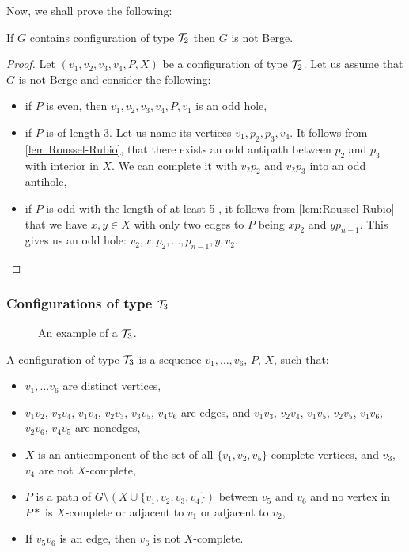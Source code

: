 Now, we shall prove the following:

\begin{theorem}
	If $G$ contains configuration of type $\mathcal{T}_2$ then $G$ is not Berge.
\end{theorem}
\begin{proof}
	Let $(v_1, v_2, v_3, v_4, P, X)$ be a configuration of type $\mathcal{T}_2$. Let us assume that $G$ is not Berge and consider the following:
	\begin{itemize}
		\item if $P$ is even, then $v_1, v_2, v_3, v_4, P, v_1$ is an odd hole,
		\item if $P$ is of length 3.  Let us name its vertices $v_1, p_2, p_3, v_4$. It follows from \cref{lem:Roussel-Rubio}, that there exists an odd antipath between $p_2$ and $p_3$ with interior in $X$. We can complete it with $v_2p_2$ and $v_2p_3$ into an odd antihole,
		\item if $P$ is odd with the length of at least 5 , it follows from \cref{lem:Roussel-Rubio} that we have $x, y \in X$ with only two edges to $P$ being $xp_2$ and $yp_{n-1}$. This gives us an odd hole: $v_2, x, p_2, \ldots, p_{n-1}, y, v_2$.
	\end{itemize}
\end{proof}

\subsubsection{Configurations of type $\mathcal{T}_3$}

\begin{wrapfigure}{r}{0.35\textwidth}
	
	\caption{An example of a $\mathcal{T}_3$.}%
	\vspace{-1.5cm}
\end{wrapfigure}

A configuration of type $\mathcal{T}_3$ is a sequence $v_1, \ldots, v_6$, $P$, $X$, such that:
\begin{itemize}
	\item $v_1, \ldots v_6$ are distinct vertices,
	\item $v_1v_2$, $v_3v_4$, $v_1v_4$, $v_2v_3$, $v_3v_5$, $v_4v_6$ are edges, and $v_1v_3$, $v_2v_4$, $v_1v_5$, $v_2v_5$, $v_1v_6$, $v_2v_6$, $v_4v_5$ are nonedges,
	\item $X$ is an anticomponent of the set of all $\{v_1, v_2, v_5\}$-complete vertices, and $v_3$, $v_4$ are not $X$-complete,
	\item $P$ is a path of $G \setminus ( X \cup \{v_1, v_2, v_3, v_4\} )$ between $v_5$ and $v_6$ and no vertex in $P*$ is $X$-complete or adjacent to $v_1$ or adjacent to $v_2$,
	\item If $v_5v_6$ is an edge, then $v_6$ is not $X$-complete.
\end{itemize}

